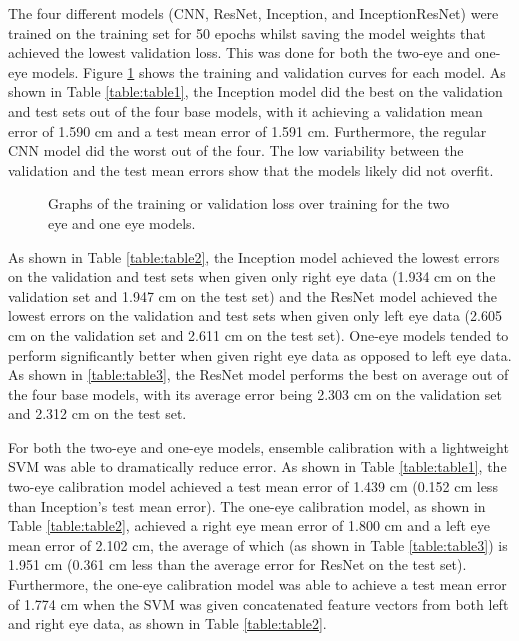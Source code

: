 \documentclass{article}
\begin{document}
The four different models (CNN, ResNet, Inception, and InceptionResNet) were trained on the training set for 50 epochs whilst saving the model weights that achieved the lowest validation loss. This was done for both the two-eye and one-eye models. Figure \ref{fig:graphs} shows the training and validation curves for each model. As shown in Table \ref{table:table1}, the Inception model did the best on the validation and test sets out of the four base models, with it achieving a validation mean error of 1.590 cm and a test mean error of 1.591 cm. Furthermore, the regular CNN model did the worst out of the four. The low variability between the validation and the test mean errors show that the models likely did not overfit.

\begin{figure}[h]
\centering
{}
\qquad
{}
\caption{Graphs of the training or validation loss over training for the two eye and one eye models.}
\label{fig:graphs}
\end{figure}

As shown in Table \ref{table:table2}, the Inception model achieved the lowest errors on the validation and test sets when given only right eye data (1.934 cm on the validation set and 1.947 cm on the test set) and the ResNet model achieved the lowest errors on the validation and test sets when given only left eye data (2.605 cm on the validation set and 2.611 cm on the test set). One-eye models tended to perform significantly better when given right eye data as opposed to left eye data. As shown in \ref{table:table3}, the ResNet model performs the best on average out of the four base models, with its average error being 2.303 cm on the validation set and 2.312 cm on the test set.

For both the two-eye and one-eye models, ensemble calibration with a lightweight SVM was able to dramatically reduce error. As shown in Table \ref{table:table1}, the two-eye calibration model achieved a test mean error of 1.439 cm (0.152 cm less than Inception's test mean error). The one-eye calibration model, as shown in Table \ref{table:table2}, achieved a right eye mean error of 1.800 cm and a left eye mean error of 2.102 cm, the average of which (as shown in Table \ref{table:table3}) is 1.951 cm (0.361 cm less than the average error for ResNet on the test set). Furthermore, the one-eye calibration model was able to achieve a test mean error of 1.774 cm when the SVM was given concatenated feature vectors from both left and right eye data, as shown in Table \ref{table:table2}.
\end{document}
